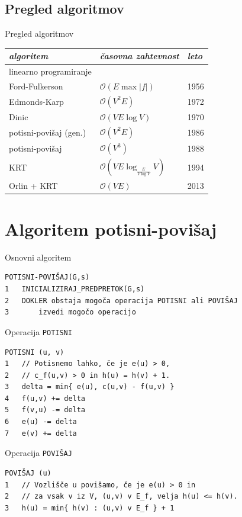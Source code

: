 \documentclass{beamer}
\begin{document}
\subsection{Pregled algoritmov}
\begin{frame}{Pregled algoritmov}
    \centering
    \begin{tabular}{|l||l|l|}\hline
        \textit{algoritem} & \textit{časovna zahtevnost} & \textit{leto}\\\hline\hline
        linearno programiranje & &\\\hline
        Ford-Fulkerson & $\mathcal{O}(E \max|f|)$ & 1956 \\\hline
        Edmonds-Karp & $\mathcal{O}(V^2E)$ & 1972 \\\hline
        Dinic & $\mathcal{O}(VE \log V)$ & 1970 \\\hline
        potisni-povišaj (gen.) & $\mathcal{O}(V^2E)$ & 1986 \\\hline
        potisni-povišaj & $\mathcal{O}(V^3)$ & 1988 \\\hline
        KRT & $\mathcal{O}(VE \log_{\frac{E}{V \log V}} V)$ & 1994 \\\hline
        Orlin + KRT & $\mathcal{O}(VE)$ & 2013 \\\hline
    \end{tabular}
\end{frame}

\section{Algoritem potisni-povišaj}
\begin{frame}[fragile]{Osnovni algoritem}
\begin{verbatim}
POTISNI-POVIŠAJ(G,s)
1   INICIALIZIRAJ_PREDPRETOK(G,s)
2   DOKLER obstaja mogoča operacija POTISNI ali POVIŠAJ
3       izvedi mogočo operacijo
\end{verbatim}
\end{frame}

\begin{frame}[fragile]{Operacija \texttt{POTISNI}}
\begin{verbatim}
POTISNI (u, v)
1   // Potisnemo lahko, če je e(u) > 0,
2   // c_f(u,v) > 0 in h(u) = h(v) + 1.
3   delta = min{ e(u), c(u,v) - f(u,v) }
4   f(u,v) += delta
5   f(v,u) -= delta
6   e(u) -= delta
7   e(v) += delta
\end{verbatim}
\end{frame}

\begin{frame}[fragile]{Operacija \texttt{POVIŠAJ}}
\begin{verbatim}
POVIŠAJ (u)
1   // Vozlišče u povišamo, če je e(u) > 0 in
2   // za vsak v iz V, (u,v) v E_f, velja h(u) <= h(v).
3   h(u) = min{ h(v) : (u,v) v E_f } + 1
\end{verbatim}
\end{frame}
\end{document}
